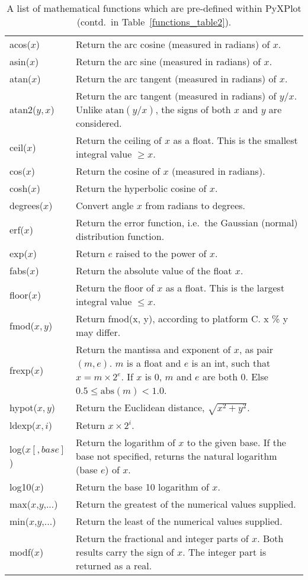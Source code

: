 \begin{table}
\begin{longtable}{|lp{8cm}|}
\hline
acos($x$)&
Return the arc cosine (measured in radians) of $x$.\\
asin($x$)&
Return the arc sine (measured in radians) of $x$.\\
atan($x$)&
Return the arc tangent (measured in radians) of $x$.\\
atan2($y,x$)&
Return the arc tangent (measured in radians) of $y/x$. Unlike $\mathrm{atan}(y/x)$, the signs of both $x$ and $y$ are considered.\\
ceil($x$)&
Return the ceiling of $x$ as a float. This is the smallest integral value $\geq x$.\\
cos($x$)&
Return the cosine of $x$ (measured in radians).\\
cosh($x$)&
Return the hyperbolic cosine of $x$.\\
degrees($x$)&
Convert angle $x$ from radians to degrees.\\
erf($x$)&
Return the error function, i.e.\ the Gaussian (normal) distribution function.\\
exp($x$)&
Return $e$ raised to the power of $x$.\\
fabs($x$)&
Return the absolute value of the float $x$.\\
floor($x$)&
Return the floor of $x$ as a float. This is the largest integral value $\leq x$.\\
fmod($x,y$)&
Return fmod(x, y), according to platform C.  x \% y may differ.\\
frexp($x$)&
Return the mantissa and exponent of $x$, as pair $(m,e)$. $m$ is a float and $e$ is an int, such that $x = m \times 2^e$. If $x$ is 0, $m$ and $e$ are both 0.  Else $0.5 \leq \mathrm{abs}(m) < 1.0$.\\
hypot($x,y$)&
Return the Euclidean distance, $\sqrt{x^2 + y^2}$.\\
ldexp($x, i$)&
Return $x \times 2^i$. \\
log($x[,base]$)&
Return the logarithm of $x$ to the given base. If the base not specified, returns the natural logarithm (base $e$) of $x$.\\
log10($x$)&
Return the base 10 logarithm of $x$.\\
max($x$,$y$,...)&
Return the greatest of the numerical values supplied.\\
min($x$,$y$,...)&
Return the least of the numerical values supplied.\\
modf($x$)&
Return the fractional and integer parts of $x$.  Both results carry the sign of $x$.  The integer part is returned as a real.\\
\hline
\end{longtable}
\caption{A list of mathematical functions which are pre-defined within PyXPlot (contd.\ in Table~\ref{functions_table2}).}
\label{functions_table}
\end{table}

